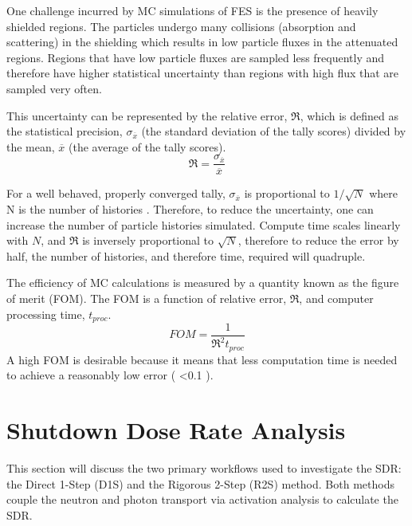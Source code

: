 One challenge incurred by MC simulations of FES is the presence of heavily
shielded regions.  The particles undergo many
collisions (absorption and scattering) in the shielding which results in low
particle fluxes in the attenuated regions.  Regions that have low
particle fluxes are sampled less frequently and therefore have higher
statistical uncertainty than regions with high flux that are sampled very
often.

This uncertainty can be represented by the relative error, $\Re$,
which is defined as the statistical precision, $\sigma_{\overline{x}}$ 
(the standard deviation of the tally scores)
divided by the mean, $\overline{x}$ (the average of the tally scores).
\begin{equation} \label{eq:1.2}
		\Re = \frac{\sigma_{\overline{x}}}{{\overline{x}}}
\end{equation}

For a well behaved, properly converged tally, $\sigma_{\overline{x}}$ is proportional
to $1/\sqrt{N}$ where N is the number
of histories \cite{mcnp_manual}.
Therefore, to reduce the uncertainty, one can 
increase the number of particle histories simulated.
Compute time scales linearly with $N$, and
$\Re$ is inversely proportional to $\sqrt{N}$, therefore to reduce the
error by half, the number of histories, and therefore time, required will
quadruple.  

The efficiency of MC calculations is measured by a quantity known as the figure of merit
(FOM).  The FOM is a function of relative error, $\Re$, and computer processing
time, $t_{proc}$.
\begin{equation} \label{eq:1.3}
	FOM = \frac{1}{{{{\Re}^2}t_{proc}}}
\end{equation}
A high FOM is desirable because it means that less computation time is needed to achieve
a reasonably low error ( <0.1 \cite{mcnp_manual}).   

\section{Shutdown Dose Rate Analysis}\label{sec:sdr_calcs}
This section will discuss the two primary workflows used to investigate the SDR:
the Direct 1-Step (D1S) \cite{d1s} and the Rigorous 2-Step (R2S) \cite{r2s}
method.  Both methods couple the neutron and photon transport via activation
analysis to calculate the SDR.

